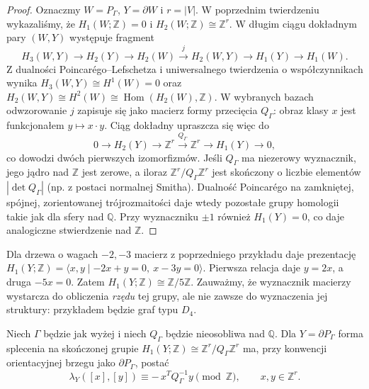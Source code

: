 \begin{proof}
Oznaczmy $W=P_\Gamma$, $Y=\partial W$ i $r=|V|$.
W poprzednim twierdzeniu wykazaliśmy, że $H_1(W;\mathbb Z)=0$
i $H_2(W;\mathbb Z)\cong\mathbb Z^r$.
W długim ciągu dokładnym pary $(W,Y)$ występuje fragment
\[
H_3(W,Y)\longrightarrow H_2(Y)\longrightarrow H_2(W)
\xrightarrow{\ j\ }H_2(W,Y)\longrightarrow H_1(Y)
\longrightarrow H_1(W).
\]
Z dualności Poincarégo--Lefschetza i uniwersalnego twierdzenia
o współczynnikach wynika
$H_3(W,Y)\cong H^1(W)=0$ oraz
$H_2(W,Y)\cong H^2(W)\cong\operatorname{Hom}(H_2(W),\mathbb Z)$.
W wybranych bazach odwzorowanie $j$ zapisuje się jako macierz
formy przecięcia $Q_\Gamma$: obraz klasy $x$ jest funkcjonałem
$y\mapsto x\cdot y$. Ciąg dokładny upraszcza się więc do
\[
0\longrightarrow H_2(Y)\longrightarrow\mathbb Z^r
\xrightarrow{Q_\Gamma}\mathbb Z^r
\longrightarrow H_1(Y)\longrightarrow0,
\]
co dowodzi dwóch pierwszych izomorfizmów. Jeśli $Q_\Gamma$
ma niezerowy wyznacznik, jego jądro nad $\mathbb Z$ jest zerowe,
a iloraz $\mathbb Z^r/Q_\Gamma\mathbb Z^r$ jest skończony
o liczbie elementów $|\det Q_\Gamma|$ (np. z postaci normalnej
Smitha). Dualność Poincarégo na zamkniętej, spójnej,
zorientowanej trójrozmaitości daje wtedy pozostałe grupy
homologii takie jak dla sfery nad $\mathbb Q$.
Przy wyznaczniku $\pm1$ również $H_1(Y)=0$, co daje
analogiczne stwierdzenie nad $\mathbb Z$.
\end{proof}

\begin{przyklad}
Dla drzewa o wagach $-2,-3$ macierz z poprzedniego
przykładu daje prezentację
$H_1(Y;\mathbb Z)=\langle x,y\mid -2x+y=0,\ x-3y=0\rangle$.
Pierwsza relacja daje $y=2x$, a druga $-5x=0$.
Zatem $H_1(Y;\mathbb Z)\cong\mathbb Z/5\mathbb Z$.
Zauważmy, że wyznacznik macierzy wystarcza do obliczenia
\emph{rzędu} tej grupy, ale nie zawsze do wyznaczenia
jej struktury: przykładem będzie graf typu $D_4$.
\end{przyklad}

\begin{stwierdzenie}
Niech $\Gamma$ będzie jak wyżej i niech $Q_\Gamma$ będzie
nieosobliwa nad $\mathbb Q$. Dla $Y=\partial P_\Gamma$
forma splecenia na skończonej grupie
$H_1(Y;\mathbb Z)\cong\mathbb Z^r/Q_\Gamma\mathbb Z^r$
ma, przy konwencji orientacyjnej brzegu jako $\partial P_\Gamma$,
postać
\[
\lambda_Y([x],[y])\equiv-\,x^TQ_\Gamma^{-1}y
\pmod{\mathbb Z}, \qquad x,y\in\mathbb Z^r.
\]
\end{stwierdzenie}

